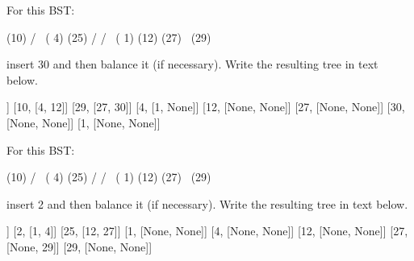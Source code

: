 \nextq
For this BST:
\begin{console}[fontsize=\footnotesize]
            (10)
          /      \
      ( 4)        (25)
     /           /    \
 ( 1)        (12)      (27)
                           \
                            (29)
\end{console}
insert 30 and then balance it (if necessary).
Write the resulting tree in text below.
\ANSWER
\begin{answercode}
[25, [10, 29]]
[10, [4, 12]]
[29, [27, 30]]
[4, [1, None]]
[12, [None, None]]
[27, [None, None]]
[30, [None, None]]
[1, [None, None]]
\end{answercode}

\nextq
For this BST:
\begin{console}[fontsize=\footnotesize]
            (10)
          /      \
      ( 4)        (25)
     /           /    \
 ( 1)        (12)      (27)
                           \
                            (29)
\end{console}
insert 2 and then balance it (if necessary).
Write the resulting tree in text below.
\ANSWER
\begin{answercode}
[10, [4, 25]]
[2, [1, 4]]
[25, [12, 27]]
[1, [None, None]]
[4, [None, None]]
[12, [None, None]]
[27, [None, 29]]
[29, [None, None]]
\end{answercode}


